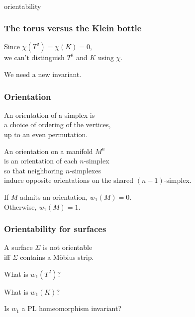 \documentclass[14pt]{beamer}
\newcommand{\setbackgroundpicture}[1]{%
\usebackgroundtemplate{
\begin{pgfpicture}{0in}{0in}{\paperwidth}{\paperheight}
\pgfputat{\pgfxy(0,0)}{\texttt{[image: \#1]}}
\color{white}
\pgfsetfillopacity{0.8}
\pgfrect[fill]{\pgfxy(0,0)}{\pgfpoint{\paperwidth}{\paperheight}}
\end{pgfpicture}
}
}
\newcommand{\clearbackgroundpicture}{\usebackgroundtemplate{}}
\begin{document}
\setbackgroundpicture{Templo_de_Afaia3.JPG}
\begin{frame}
  \vfill
  \begin{center}
    \scalebox{5}{\Huge $w_1$} \\
   \vspace{2ex}orientability
  \end{center}
  \vfill
\end{frame}
\clearbackgroundpicture

\begin{frame}
  \frametitle{The torus versus the Klein bottle}

Since $\chi(T^2) = \chi(K) = 0$, \\
we can't distinguish $T^2$ and $K$ using $\chi$.

\pause
\vfill

We need a new invariant.

\vfill

\end{frame}

\begin{frame}
  \frametitle{Orientation}

  An orientation of a simplex is \\
  a choice of ordering of the vertices,\\
  up to an even permutation.

  \vfill
  \pause

  \begin{definition}
    An orientation on a manifold $M^n$ \\
    is an orientation of each $n$-simplex \\
    so that neighboring $n$-simplexes \\
    induce opposite orientations on the shared $(n-1)$-simplex.
  \end{definition}
  \vfill
  \pause

  If $M$ admits an orientation, $w_1(M) = 0$. \\
  Otherwise, $w_1(M) = 1$.

\end{frame}

\begin{frame}
  \frametitle{Orientability for surfaces}

  \begin{theorem}
    A surface $\Sigma$ is not orientable \\
    iff $\Sigma$ contains a M\"obius strip.
  \end{theorem}
  \pause
  \begin{problem}
   What is $w_1(T^2)$?
 \end{problem}
  \pause
  \begin{problem}
    What is $w_1(K)$?
  \end{problem}
  \pause
 \begin{problem}
   Is $w_1$ a PL homeomorphism invariant?
 \end{problem}
  
\end{frame}
\end{document}
